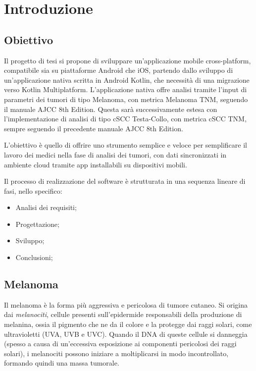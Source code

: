 
\chapter{Introduzione}\label{ch:introduzione}

\section{Obiettivo}\label{sec:obiettivo}
Il progetto di tesi si propone di sviluppare un'applicazione mobile cross-platform, compatibile sia su piattaforme
Android che iOS, partendo dallo sviluppo di un'applicazione nativa scritta in Android Kotlin, che necessità
di una migrazione verso Kotlin Multiplatform.
L'applicazione nativa offre analisi tramite l'input di parametri dei tumori di tipo Melanoma, con metrica Melanoma TNM,
seguendo il manuale AJCC 8th Edition.
Questa sarà successivamente estesa con l'implementazione di analisi di tipo cSCC Testa-Collo, con metrica cSCC TNM, sempre seguendo
il precedente manuale AJCC 8th Edition\@.

L'obiettivo è quello di offrire uno strumento semplice e veloce per semplificare il lavoro dei medici nella fase di analisi dei tumori,
con dati sincronizzati in ambiente cloud tramite app installabili su dispositivi mobili.

Il processo di realizzazione del software è strutturata in una sequenza lineare di fasi, nello specifico:

\begin{itemize}
    \item Analisi dei requisiti;
    \item Progettazione;
    \item Sviluppo;
    \item Conclusioni;
\end{itemize}

\section{Melanoma}\label{sec:melanoma}
Il melanoma è la forma più aggressiva e pericolosa di tumore cutaneo.
Si origina dai \textit{melanociti}, cellule presenti sull'epidermide responsabili della produzione di melanina, ossia il
pigmento che ne da il colore e la protegge dai raggi solari, come ultravioletti (UVA, UVB e UVC).
Quando il DNA di queste cellule si danneggia (spesso a causa di un'eccessiva esposizione ai componenti pericolosi dei raggi solari),
i melanociti possono iniziare a moltiplicarsi in modo incontrollato, formando quindi una massa tumorale.

